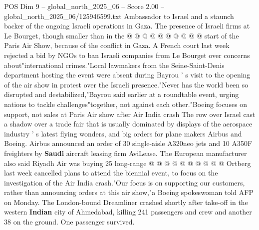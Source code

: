 \begin{textsample}{POS Dim 9 – global\_north\_2025\_06 – Score 2.00 – global\_north\_2025\_06/125946599.txt}
Ambassador to Israel and a staunch backer of the ongoing Israeli operations in Gaza.
The presence of Israeli firms at Le Bourget, though smaller than in the @ @ @ @ @ @ @ @ @ @ start of the Paris Air Show, because of the conflict in Gaza.
A French court last week rejected a bid by NGOs to ban Israeli companies from Le Bourget over concerns about"international crimes."Local lawmakers from the Seine-Saint-Denis department hosting the event were absent during Bayrou ' s visit to the opening of the air show in protest over the Israeli presence."Never has the world been so disrupted and destabilized,"Bayrou said earlier at a roundtable event, urging nations to tackle challenges"together, not against each other."Boeing focuses on support, not sales at Paris Air show after Air India crash The row over Israel cast a shadow over a trade fair that is usually dominated by displays of the aerospace industry ' s latest flying wonders, and big orders for plane makers Airbus and Boeing.
Airbus announced an order of 30 single-aisle A320neo jets and 10 A350F freighters by \textbf{Saudi} aircraft leasing firm AviLease.
The European manufacturer also said Riyadh Air was buying 25 long-range @ @ @ @ @ @ @ @ @ @ Ortberg last week cancelled plans to attend the biennial event, to focus on the investigation of the Air India crash."Our focus is on supporting our customers, rather than announcing orders at this air show,"a Boeing spokeswoman told AFP on Monday.
The London-bound Dreamliner crashed shortly after take-off in the western \textbf{Indian} city of Ahmedabad, killing 241 passengers and crew and another 38 on the ground.
One passenger survived.

\end{textsample}
